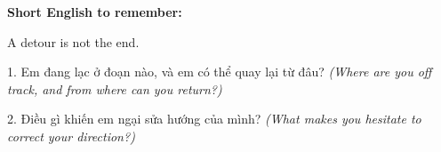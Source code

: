 \begin{ghinhoanh}
\textbf{Short English to remember:}

A detour is not the end.

\end{ghinhoanh}

\begin{tuhocnhanh}
1. Em đang lạc ở đoạn nào, và em có thể quay lại từ đâu? \textit{(Where are you off track, and from where can you return?)}

2. Điều gì khiến em ngại sửa hướng của mình? \textit{(What makes you hesitate to correct your direction?)}
\end{tuhocnhanh}
\ngancach